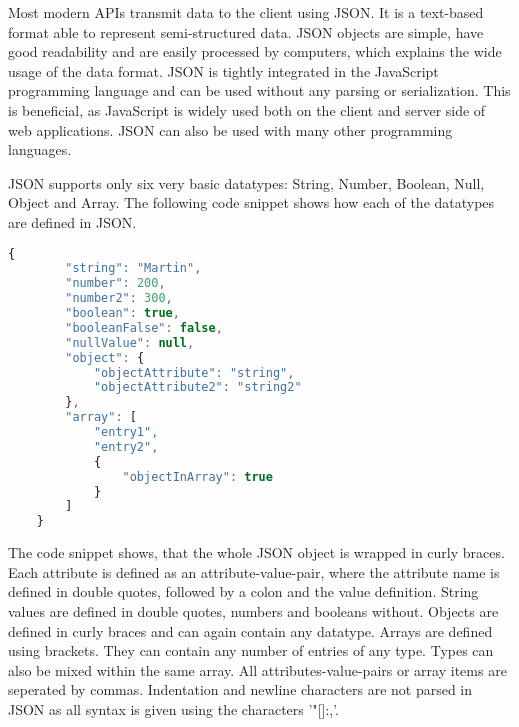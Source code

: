 Most modern APIs transmit data to the client using \ac{JSON}.
It is a text-based format able to represent semi-structured data. \cite{MozillaJSON}
JSON objects are simple, have good readability and are easily processed by computers,
which explains the wide usage of the data format\cite{OracleJSON}.
JSON is tightly integrated in the JavaScript programming language and can be used without any parsing or serialization.\cite{OracleJSON}
This is beneficial, as JavaScript is widely used both on the client and server side of web applications. 
JSON can also be used with many other programming languages. \cite{JsonOrgIntroduction}

JSON supports only six very basic datatypes: String, Number, Boolean, Null, Object and Array.\cite{OracleJSON}
The following code snippet shows how each of the datatypes are defined in JSON.

\begin{lstlisting}[language=JavaScript]
    {
        "string": "Martin",
        "number": 200,
        "number2": 300,
        "boolean": true,
        "booleanFalse": false,
        "nullValue": null,
        "object": {
            "objectAttribute": "string",
            "objectAttribute2": "string2"
        },
        "array": [
            "entry1",
            "entry2",
            {
                "objectInArray": true
            }
        ]
    }
\end{lstlisting}

The code snippet shows, that the whole JSON object is wrapped in curly braces.
Each attribute is defined as an attribute-value-pair, where the attribute name is defined in 
double quotes, followed by a colon and the value definition. String values are defined in 
double quotes, numbers and booleans without. Objects are defined in curly braces and can
again contain any datatype.
Arrays are defined using brackets. They can contain any number of entries of any type.
Types can also be mixed within the same array.
All attributes-value-pairs or array items are seperated by commas.
Indentation and newline characters are not parsed in JSON as all syntax is given using
the characters '"{}[]:,'.\cite{JsonOrgIntroduction}

